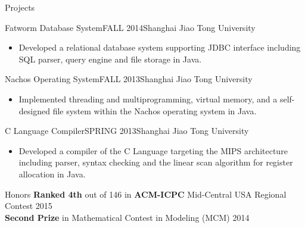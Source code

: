 \documentclass{resume} %
\begin{document}
\begin{rSection}{Projects}%

\begin{rSubsection}{Fatworm Database System}{FALL 2014}{Shanghai Jiao Tong University}
\begin{itemize}
\item Developed a relational database system supporting JDBC interface including SQL parser, query engine and file storage in Java.
\end{itemize}
\end{rSubsection}
\vspace{3pt}
\begin{rSubsection}{Nachos Operating System}{FALL 2013}{Shanghai Jiao Tong University}
\begin{itemize}
\item Implemented threading and multiprogramming, virtual memory, and a self-designed file system within the Nachos operating system in Java.
\end{itemize}
\end{rSubsection}
\vspace{3pt}
\begin{rSubsection}{C Language Compiler}{SPRING 2013}{Shanghai Jiao Tong University}
\begin{itemize}
\item Developed a compiler of the C Language targeting the MIPS architecture including parser, syntax checking and the linear scan algorithm for register allocation in Java.
\end{itemize}
\end{rSubsection}
\vspace{3pt}

\end{rSection}


\begin{rSection}{Honors}
\textbf{Ranked 4th} out of 146 in \textbf{ACM-ICPC} Mid-Central USA Regional Contest \hfill 2015\\
\textbf{Second Prize} in Mathematical Contest in Modeling (MCM) \hfill 2014\\
\end{rSection}

\end{document}
